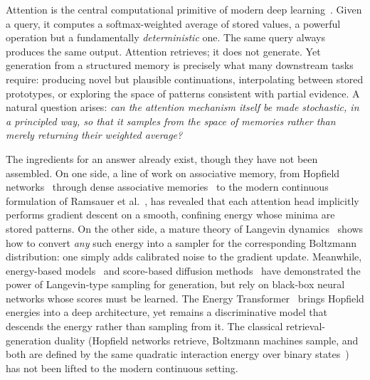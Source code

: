 
Attention is the central computational primitive of modern deep learning~\cite{vaswaniAttentionAllYou2017}. Given a query, it computes a softmax-weighted average of stored values, a powerful operation but a fundamentally \emph{deterministic} one. The same query always produces the same output. Attention retrieves; it does not generate. Yet generation from a structured memory is precisely what many downstream tasks require: producing novel but plausible continuations, interpolating between stored prototypes, or exploring the space of patterns consistent with partial evidence. A natural question arises: \emph{can the attention mechanism itself be made stochastic, in a principled way, so that it samples from the space of memories rather than merely returning their weighted average?}

The ingredients for an answer already exist, though they have not been assembled. On one side, a line of work on associative memory, from Hopfield networks~\cite{hopfieldNeuralNetworksPhysical1982} through dense associative memories~\cite{krotovDenseAssociativeMemory2016,krotovLargeAssociativeMemory2021} to the modern continuous formulation of Ramsauer et al.~\cite{ramsauerHopfieldNetworksAll2021}, has revealed that each attention head implicitly performs gradient descent on a smooth, confining energy whose minima are stored patterns. On the other side, a mature theory of Langevin dynamics~\cite{robertsTweedieExponentialConvergence1996,wellingBayesianLearningStochastic2011,durmusNonasymptoticAnalysisUnadjusted2017} shows how to convert \emph{any} such energy into a sampler for the corresponding Boltzmann distribution: one simply adds calibrated noise to the gradient update. Meanwhile, energy-based models~\cite{lecunTutorialEnergyBased2006,songHowTrainEnergyBased2021} and score-based diffusion methods~\cite{songGenerativeModelingEstimating2019,songScoreBasedGenerativeModeling2021} have demonstrated the power of Langevin-type sampling for generation, but rely on black-box neural networks whose scores must be learned. The Energy Transformer~\cite{hooverEnergyTransformer2024} brings Hopfield energies into a deep architecture, yet remains a discriminative model that descends the energy rather than sampling from it. The classical retrieval-generation duality (Hopfield networks retrieve, Boltzmann machines sample, and both are defined by the same quadratic interaction energy over binary states~\cite{ackeleyLearningAlgorithmBoltzmann1985}) has not been lifted to the modern continuous setting.

